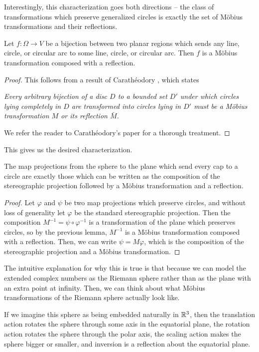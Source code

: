 Interestingly, this characterization goes both directions -- the class of transformations which preserve generalized circles is exactly the set of M\"obius transformations and their reflections.





\begin{lemma}
  Let $f:\Omega\to V$ be a bijection between two planar regions 
  which sends any line, circle, or circular arc to some line, circle, or circular arc. 
  Then $f$ is a M\"{o}bius transformation composed with a 
  reflection.
\end{lemma}
\begin{proof}
	
This follows from a result of
Carath\'{e}odory \cite{caratheodory}, which states

\begin{displayquote}
\textit{  Every arbitrary bijection of a disc $D$ to a bounded set $D'$ under which
  circles lying completely in $D$ are transformed into circles 
  lying in $D'$ must be a M\"obius transformation $M$ or its reflection $\bar M$.
}
\end{displayquote}

We refer the reader to Carath\'{e}odory's paper for a thorough treatment.

\end{proof}

This gives us the desired characterization.  


\begin{theorem}\label{thm:stereographic_mobius}
  The map projections from the sphere to the plane which send every
  cap to a circle are exactly those which can be written as the
  composition of the stereographic projection followed by a 
  M\"{o}bius transformation and a reflection.
\end{theorem}
\begin{proof}
  Let $\varphi$ and $\psi$ be two map projections which preserve
  circles, and without loss of generality let $\varphi$ be the
  standard stereographic projection.  Then the composition
  $M^{-1}=\psi\circ\varphi^{-1}$ is a transformation of 
  the plane which preserves circles, so by the previous lemma, 
  $M^{-1}$ is a M\"{o}bius transformation composed with a reflection. 
  Then, we can write $\psi= M\varphi$, which is the
  composition of the stereographic projection and a M\"obius transformation.
\end{proof}



The intuitive explanation for why this is true is that because we can model the extended complex numbers as the Riemann sphere rather than as the plane with an extra point at infinity.  Then, we can think about what M\"obius transformations of the Riemann sphere actually look like.  

If we imagine this sphere as being embedded naturally in $\mathbb{R}^3$, then the translation action rotates the sphere through some axis in the equatorial plane, the rotation action rotates the sphere through the polar axis, the scaling action makes the sphere bigger or smaller, and inversion is a reflection about the equatorial plane. 
